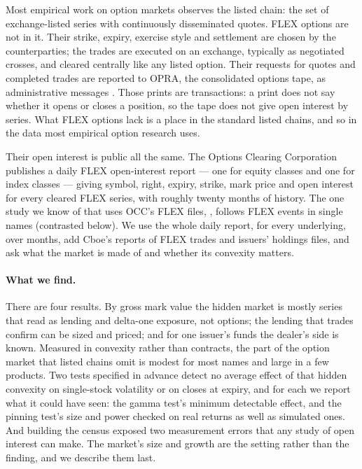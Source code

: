 \documentclass[11pt]{article}
\begin{document}
Most empirical work on option markets observes the listed chain: the set of
exchange-listed series with continuously disseminated quotes. FLEX options are not in
it. Their strike, expiry, exercise style and settlement are chosen by the counterparties;
the trades are executed on an exchange, typically as negotiated crosses, and cleared
centrally like any listed option. Their requests for quotes and completed trades are
reported to OPRA, the consolidated options tape, as administrative messages
\citep{phlx2021}. Those prints are transactions: a print does not say whether it opens or
closes a position, so the tape does not give open interest by series. What FLEX options
lack is a place in the standard listed chains, and so in the data most empirical option
research uses.

Their open interest is public all the same. The Options Clearing Corporation publishes a
daily FLEX open-interest report --- one for equity classes and one for index classes
--- giving symbol, right, expiry, strike, mark price and open interest for every
cleared FLEX series, with roughly twenty months of history. The one study we know of
that uses OCC's FLEX files, \citet{prakash2026}, follows FLEX events in single names
(contrasted below). We use the whole daily report, for every underlying, over
\PanelMonths{} months, add Cboe's reports of FLEX trades and issuers' holdings files,
and ask what the market is made of and whether its convexity matters.

\paragraph{What we find.} There are four results. By gross mark value the hidden market
is mostly series that read as lending and delta-one exposure, not options; the lending
that trades confirm can be sized and priced; and for one issuer's funds the dealer's side
is known.
Measured in convexity rather than contracts, the part of the option market that listed
chains omit is modest for most names and large in a few products. Two tests specified in
advance detect no average effect of that hidden convexity on single-stock volatility or on
closes at expiry, and for each we report what it could have seen: the gamma test's minimum detectable effect, and the pinning test's size
and power checked on real returns as well as simulated ones. And building the census
exposed two measurement errors that any study of open interest can make. The
market's size and growth are the setting rather than the finding, and we describe them
last.
\end{document}
